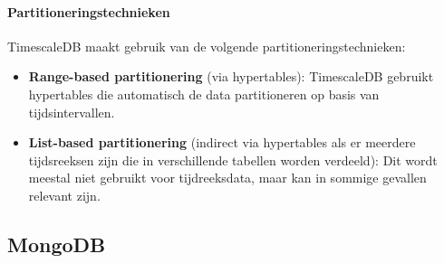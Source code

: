 \paragraph{Partitioneringstechnieken}  
TimescaleDB maakt gebruik van de volgende partitioneringstechnieken:
\begin{itemize}
    \item \textbf{Range-based partitionering} (via hypertables): TimescaleDB gebruikt hypertables die automatisch de data partitioneren op basis van tijdsintervallen.
    \item \textbf{List-based partitionering} (indirect via hypertables als er meerdere tijdsreeksen zijn die in verschillende tabellen worden verdeeld): Dit wordt meestal niet gebruikt voor tijdreeksdata, maar kan in sommige gevallen relevant zijn.
\end{itemize}

\begin{table}[H]
    \centering
    \caption{Overzicht van de specificaties van TimescaleDB. \cite{TimescaleDBDocumentation}}
\end{table}

\subsection{MongoDB}

